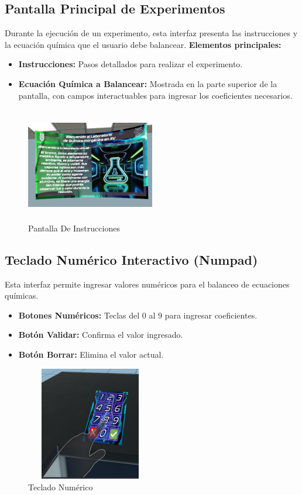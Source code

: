 \subsection{Pantalla Principal de Experimentos}
Durante la ejecución de un experimento, esta interfaz presenta las instrucciones y la ecuación química que el usuario debe balancear.
\textbf{Elementos principales:}
\begin{itemize}
    \item \textbf{Instrucciones:} Pasos detallados para realizar el experimento.
    \item \textbf{Ecuación Química a Balancear:} Mostrada en la parte superior de la pantalla, con campos interactuables para ingresar los coeficientes necesarios.
\end{itemize}
\begin{figure}[thbp]
    \centering
    \includegraphics[width=0.5\textwidth, height = 5cm]{img/GUI/UI_Principal.png}
    \caption{Pantalla De Instrucciones}
    \label{fig:Pantalla_De_Instrucciones}
\end{figure}

\subsection{Teclado Numérico Interactivo (Numpad)}
Esta interfaz permite ingresar valores numéricos para el balanceo de ecuaciones químicas.
\begin{itemize}
    \item \textbf{Botones Numéricos:} Teclas del 0 al 9 para ingresar coeficientes.
    \item \textbf{Botón Validar:} Confirma el valor ingresado.
    \item \textbf{Botón Borrar:} Elimina el valor actual.
\end{itemize}
\begin{figure}[thbp]
    \centering
    \includegraphics[width=0.5\textwidth, height = 5cm]{img/GUI/Num_Pad.png}
    \caption{Teclado Numérico}
    \label{fig:Teclado_Numérico}
\end{figure}
\newpage
